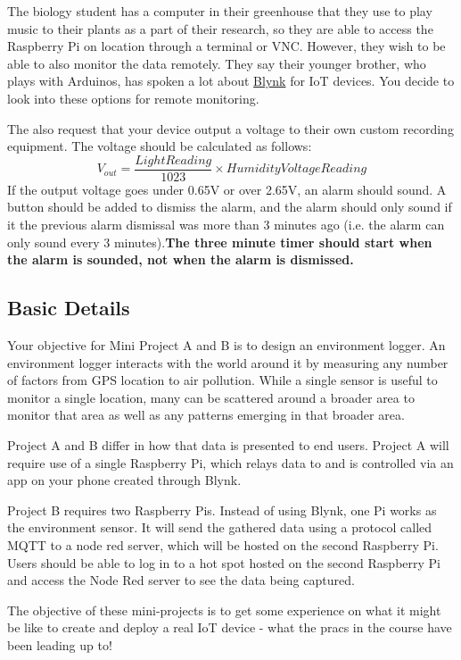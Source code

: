 The biology student has a computer in their greenhouse that they use to play music to their plants as a part of their research, so they are able to access the Raspberry Pi on location through a terminal or VNC. However, they wish to be able to also monitor the data remotely. They say their younger brother, who plays with Arduinos, has spoken a lot about \href{https://blynk.io/}{Blynk} for IoT devices. You decide to look into these options for remote monitoring. 

The also request that your device output a voltage to their own custom recording equipment. The voltage should be calculated as follows:
$$
V_{out} = \frac{Light Reading}{1023} \times Humidity Voltage Reading
$$
If the output voltage goes under 0.65V or over 2.65V, an alarm should sound. A button should be added to dismiss the alarm, and the alarm should only sound if it the previous alarm dismissal was more than 3 minutes ago (i.e. the alarm can only sound every 3 minutes).\textbf{The three minute timer should start when the alarm is sounded, not when the alarm is dismissed.}


\subsection{Basic Details}
Your objective for Mini Project A and B is to design an environment logger. An environment logger interacts with the world around it by measuring any number of factors from GPS location to air pollution. While a single sensor is useful to monitor a single location, many can be scattered around a broader area to monitor that area as well as any patterns emerging in that broader area.

Project A and B differ in how that data is presented to end users. Project A will require use of a single Raspberry Pi, which relays data to and is controlled via an app on your phone created through Blynk.

Project B requires two Raspberry Pis. Instead of using Blynk, one Pi works as the environment sensor. It will send the gathered data using a protocol called MQTT to a node red server, which will be hosted on the second Raspberry Pi. Users should be able to log in to a hot spot hosted on the second Raspberry Pi and access the Node Red server to see the data being captured.

The objective of these mini-projects is to get some experience on what it might be like to create and deploy a real IoT device - what the pracs in the course have been leading up to!






